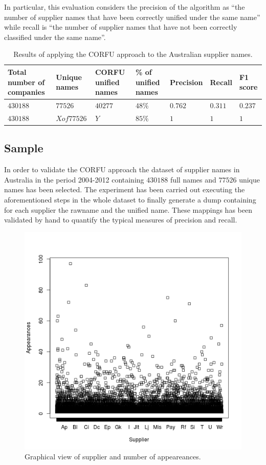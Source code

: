 \documentclass{llncs}
\begin{document}
In particular, this evaluation considers the precision of the algorithm as ``the number of supplier 
names that have been correctly unified under the same name'' while recall is 
``the number of supplier names that have not been correctly classified under the same name''. 


\begin{table}[!h]
\renewcommand{\arraystretch}{1.3}
\begin{center}
\begin{tabular}{|p{3cm}|p{3cm}|p{2cm}|p{2cm}|l|l|l|}
\hline
  \textbf{Total number of companies} & \textbf{Unique names}& \textbf{CORFU unified names}& \textbf{\% of unified names} & \textbf{Precision} & \textbf{Recall} & \textbf{F1 score} \\  \hline
   $430188$ & $77526$ & $40277$  &$48\%$ & $0.762$ & $0.311$&$0.237$ \\ \hline   
   $430188$ & $X of 77526$ & $Y$ & $85\%$&  $1$ & $1$ &$1$\\ \hline
  \hline
  \end{tabular}
  \caption{Results of applying the CORFU approach to the Australian supplier names.}
  \label{tabla:aus-results}
  \end{center}
\end{table} 


\subsection{Sample}
In order to validate the CORFU approach the dataset of supplier names in Australia 
in the period 2004-2012 containing $430188$ full names 
and $77526$ unique names has been selected. The experiment has been 
carried out executing the aforementioned steps in the whole dataset 
to finally generate a dump containing for each supplier the 
rawname and the unified name. These mappings has been validated 
by hand to quantify the typical measures of precision and recall. 


\begin{figure}[!htb]
\centering
	\includegraphics[width=6
	cm]{./imgs/corfu-stats}
\caption{Graphical view of supplier and number of appeareances.}
\label{fig:results-graph-3}
\end{figure}
\end{document}
